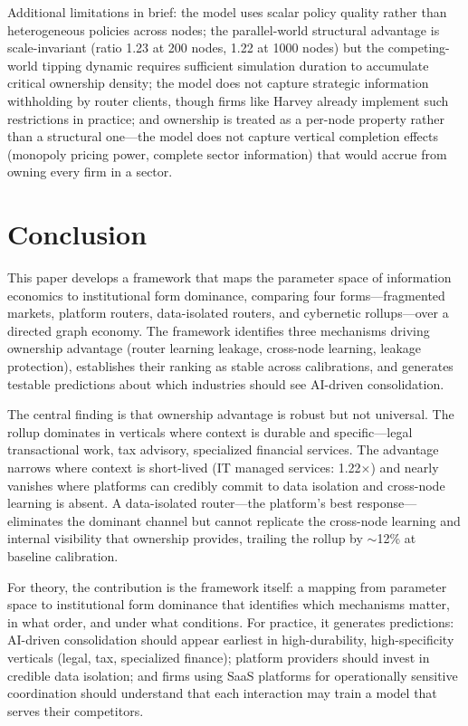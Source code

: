 \documentclass[12pt]{article}
\theoremstyle{definition}
\begin{document}
Additional limitations in brief: the model uses scalar policy quality rather than heterogeneous policies across nodes; the parallel-world structural advantage is scale-invariant (ratio 1.23 at 200 nodes, 1.22 at 1000 nodes) but the competing-world tipping dynamic requires sufficient simulation duration to accumulate critical ownership density; the model does not capture strategic information withholding by router clients, though firms like Harvey already implement such restrictions in practice; and ownership is treated as a per-node property rather than a structural one---the model does not capture vertical completion effects (monopoly pricing power, complete sector information) that would accrue from owning every firm in a sector.

\section{Conclusion}

This paper develops a framework that maps the parameter space of information economics to institutional form dominance, comparing four forms---fragmented markets, platform routers, data-isolated routers, and cybernetic rollups---over a directed graph economy. The framework identifies three mechanisms driving ownership advantage (router learning leakage, cross-node learning, leakage protection), establishes their ranking as stable across calibrations, and generates testable predictions about which industries should see AI-driven consolidation.

The central finding is that ownership advantage is robust but not universal. The rollup dominates in verticals where context is durable and specific---legal transactional work, tax advisory, specialized financial services. The advantage narrows where context is short-lived (IT managed services: 1.22$\times$) and nearly vanishes where platforms can credibly commit to data isolation and cross-node learning is absent. A data-isolated router---the platform's best response---eliminates the dominant channel but cannot replicate the cross-node learning and internal visibility that ownership provides, trailing the rollup by $\sim$12\% at baseline calibration.

For theory, the contribution is the framework itself: a mapping from parameter space to institutional form dominance that identifies which mechanisms matter, in what order, and under what conditions. For practice, it generates predictions: AI-driven consolidation should appear earliest in high-durability, high-specificity verticals (legal, tax, specialized finance); platform providers should invest in credible data isolation; and firms using SaaS platforms for operationally sensitive coordination should understand that each interaction may train a model that serves their competitors.
\end{document}
